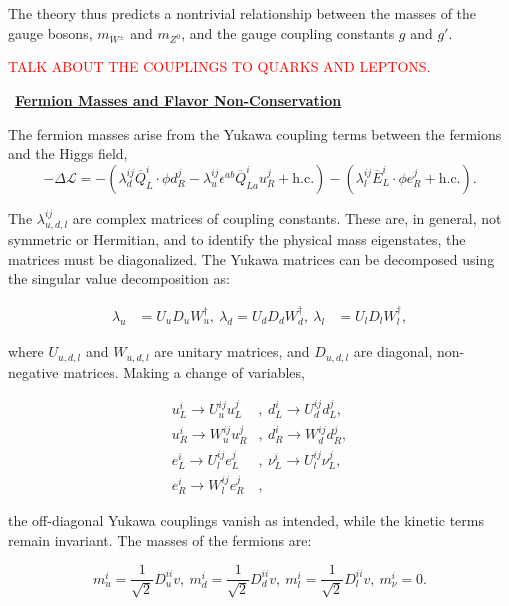 The theory thus predicts a nontrivial relationship between the masses of the gauge bosons, $m_{W^{\pm}}$ and $m_{Z^0}$, and the gauge coupling constants $g$ and $g'$.

\textcolor{red}{TALK ABOUT THE COUPLINGS TO QUARKS AND LEPTONS.}

\ 
\underline{\textbf{Fermion Masses and Flavor Non-Conservation}}

The fermion masses arise from the Yukawa coupling terms between the fermions and the Higgs field,
\begin{equation}\label{eqn:lagrangian-yukawa-couplings}
	-\Delta \mathcal{L} = - \left(\lambda_d^{ij} \overline{Q}_L^i \cdot \phi d_R^j - \lambda_u^{ij} \epsilon^{ab}\overline{Q}^i_{La} u_R^j + \mathrm{h.c.}\right) - \left(\lambda_l^{ij} \overline{E}^i_L \cdot \phi e_R^j + \mathrm{h.c.}\right).
\end{equation}
 
 The $\lambda_{u,d,l}^{ij}$ are complex matrices of coupling constants. These are, in general, not symmetric or Hermitian, and to identify the physical mass eigenstates, the matrices must be diagonalized. The Yukawa matrices can be decomposed using the singular value decomposition as:

\begin{align}
	\lambda_u &= U_u D_u W_u^{\dagger},\ \lambda_d = U_d D_d W_d^{\dagger},\ \lambda_l &= U_l D_l W_l^{\dagger},
\end{align}
 
where $U_{u,d,l}$ and $W_{u,d,l}$ are unitary matrices, and $D_{u,d,l}$ are diagonal, non-negative matrices. Making a change of variables,

\begin{align}\label{eqn:yukawa-diagonalization}
	u_L^i\rightarrow U_{u}^{ij}u_L^j&,\ d_L^i\rightarrow U_d^{ij}d_L^j, \\
	u_R^i\rightarrow W_{u}^{ij}u_R^j&,\ d_R^i\rightarrow W_d^{ij}d_R^j, \\
	e_L^i\rightarrow U_l^{ij}e_L^j&,\ \nu_L^i\rightarrow U_l^{ij}\nu_L^j, \\
	e_R^i\rightarrow W_l^{ij}e_R^j&,
\end{align}

the off-diagonal Yukawa couplings vanish as intended, while the kinetic terms remain invariant. The masses of the fermions are:

\begin{equation}
	m_u^i = \frac{1}{\sqrt{2}} D_u^{ii}v,\ m_d^i = \frac{1}{\sqrt{2}} D_d^{ii}v,\ m_l^i = \frac{1}{\sqrt{2}} D_l^{ii}v,\ m_{\nu}^i = 0.
\end{equation}


